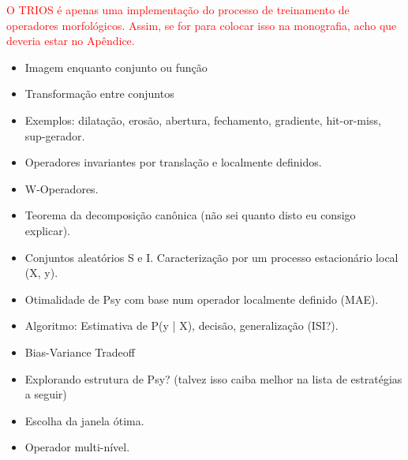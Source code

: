 \documentclass[a4paper,11pt]{article}
\newcommand{\TODO}[1]{\textcolor{red}{#1}}
\begin{document}
\TODO{O TRIOS é apenas uma implementação do processo de treinamento de
  operadores morfológicos. Assim, se for para colocar isso na
  monografia, acho que deveria estar no Apêndice.}
      \begin{itemize}
        \item Imagem enquanto conjunto ou função
        \item Transformação entre conjuntos
        \item Exemplos: dilatação, erosão, abertura, fechamento, gradiente, hit-or-miss, sup-gerador.
        \item Operadores invariantes por translação e localmente definidos.
        \item W-Operadores.
        \item Teorema da decomposição canônica (não sei quanto disto eu consigo explicar).
        \item Conjuntos aleatórios S e I. Caracterização por um processo estacionário local (X, y).
        \item Otimalidade de Psy com base num operador localmente definido (MAE).
        \item Algoritmo: Estimativa de P(y | X), decisão, generalização (ISI?).
        \item Bias-Variance Tradeoff
        \item Explorando estrutura de Psy? (talvez isso caiba melhor na lista de estratégias a seguir)
        \item Escolha da janela ótima.
        \item Operador multi-nível.
      \end{itemize}





%
{\small 
}
\end{document}
